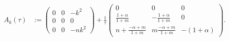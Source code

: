 \documentclass[a4paper,11pt]{article}
\theoremstyle{remark}
\begin{document}
\begin{equation}
\begin{aligned}
 A_k(\tau)&:=\begin{pmatrix}
   0 & 0 & -k^2\\
   0 & 0 & 0\\
   0 & 0 & -nk^2
  \end{pmatrix}
  + \frac{1}{\tau}
  \begin{pmatrix}
   0 & 0 & 0\\
   \tfrac{1+\alpha}{1+m} & -\tfrac{1+\alpha}{1+m} & 0\\
   n+ \tfrac{-\alpha+m}{1+m} & m\tfrac{-\alpha+m}{1+m}& -(1+\alpha)
  \end{pmatrix}.
\end{aligned}
\end{equation}
\end{document}
